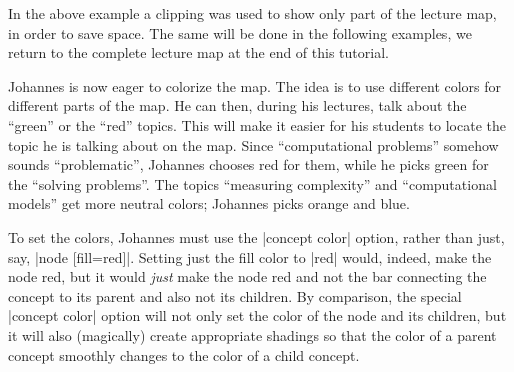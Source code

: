 In the above example a clipping was used to show only part of the lecture map,
in order to save space. The same will be done in the following examples, we
return to the complete lecture map at the end of this tutorial.

Johannes is now eager to colorize the map. The idea is to use different colors
for different parts of the map. He can then, during his lectures, talk about
the ``green'' or the ``red'' topics. This will make it easier for his students
to locate the topic he is talking about on the map. Since ``computational
problems'' somehow sounds ``problematic'', Johannes chooses red for them, while
he picks green for the ``solving problems''. The topics ``measuring
complexity'' and ``computational models'' get more neutral colors; Johannes
picks orange and blue.

To set the colors, Johannes must use the |concept color| option, rather than
just, say, |node [fill=red]|. Setting just the fill color to |red| would,
indeed, make the node red, but it would \emph{just} make the node red and not
the bar connecting the concept to its parent and also not its children. By
comparison, the special |concept color| option will not only set the color of
the node and its children, but it will also (magically) create appropriate
shadings so that the color of a parent concept smoothly changes to the color of
a child concept.

